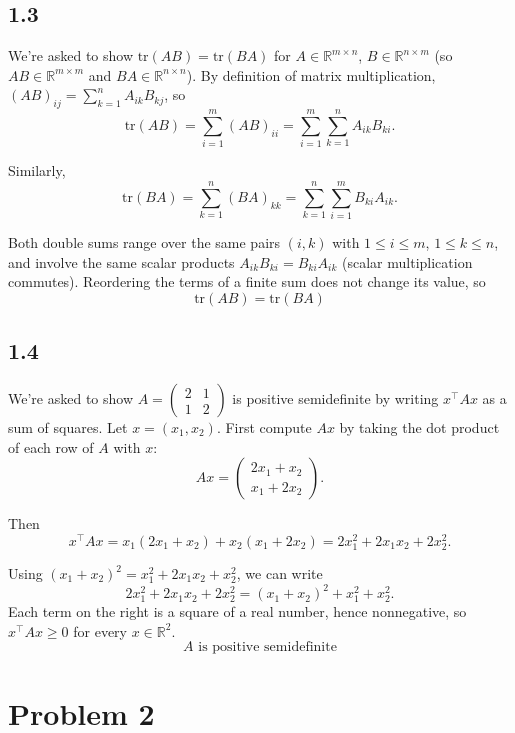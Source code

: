 \documentclass{article}
\begin{document}
\subsection*{1.3}

We're asked to show $\text{tr}(AB) = \text{tr}(BA)$ for $A \in \mathbb{R}^{m\times n}$, $B \in \mathbb{R}^{n \times m}$ (so $AB \in \mathbb{R}^{m \times m}$ and $BA \in \mathbb{R}^{n \times n}$). By definition of matrix multiplication, $(AB)_{ij} = \sum_{k=1}^n A_{ik}B_{kj}$, so
\[
\text{tr}(AB) = \sum_{i=1}^m (AB)_{ii} = \sum_{i=1}^m \sum_{k=1}^n A_{ik}B_{ki}.
\]

\medskip
\noindent
Similarly,
\[
\text{tr}(BA) = \sum_{k=1}^n (BA)_{kk} = \sum_{k=1}^n \sum_{i=1}^m B_{ki}A_{ik}.
\]

\medskip
\noindent
Both double sums range over the same pairs $(i,k)$ with $1 \le i \le m$, $1 \le k \le n$, and involve the same scalar products $A_{ik}B_{ki} = B_{ki}A_{ik}$ (scalar multiplication commutes). Reordering the terms of a finite sum does not change its value, so
\[
\boxed{\text{tr}(AB) = \text{tr}(BA)}
\]

\subsection*{1.4}

We're asked to show $A = \begin{pmatrix} 2 & 1 \\ 1 & 2 \end{pmatrix}$ is positive semidefinite by writing $x^\top A x$ as a sum of squares. Let $x = (x_1, x_2)$. First compute $Ax$ by taking the dot product of each row of $A$ with $x$:
\[
Ax = \begin{pmatrix} 2x_1 + x_2 \\ x_1 + 2x_2 \end{pmatrix}.
\]

\medskip
\noindent
Then
\[
x^\top A x = x_1(2x_1+x_2) + x_2(x_1+2x_2) = 2x_1^2 + 2x_1x_2 + 2x_2^2.
\]

\medskip
\noindent
Using $(x_1+x_2)^2 = x_1^2 + 2x_1x_2 + x_2^2$, we can write
\[
2x_1^2 + 2x_1x_2 + 2x_2^2 = (x_1+x_2)^2 + x_1^2 + x_2^2.
\]
Each term on the right is a square of a real number, hence nonnegative, so $x^\top A x \ge 0$ for every $x \in \mathbb{R}^2$.
\[
\boxed{A \text{ is positive semidefinite}}
\]

\section*{Problem 2}
\end{document}
